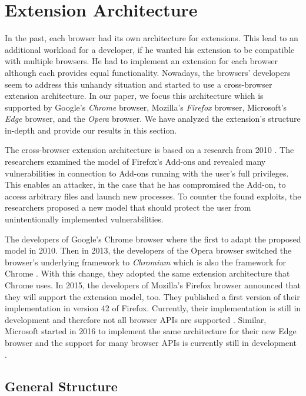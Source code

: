 \newpage
\section{Extension Architecture}
\label{sec:extensionArchitecture}

	In the past, each browser had its own architecture for extensions. This lead to an additional workload for a developer, if he wanted his extension to be compatible with multiple browsers. He had to implement an extension for each browser although each provides equal functionality. Nowadays, the browsers' developers seem to address this unhandy situation and started to use a cross-browser extension architecture. In our paper, we focus this architecture which is supported by Google's \textit{Chrome} browser, Mozilla's \textit{Firefox} browser, Microsoft's \textit{Edge} browser, and the \textit{Opera} browser. We have analyzed the extension's structure in-depth and provide our results in this section.

	The cross-browser extension architecture is based on a research from 2010 \cite{Barth10protectingbrowsers}. The researchers examined the model of Firefox's Add-ons and revealed many vulnerabilities in connection to Add-ons running with the user's full privileges. This enables an attacker, in the case that he has compromised the Add-on, to access arbitrary files and launch new processes. To counter the found exploits, the researchers proposed a new model that should protect the user from unintentionally implemented vulnerabilities.

	The developers of Google's Chrome browser where the first to adapt the proposed model in 2010. Then in 2013, the developers of the Opera browser switched the browser's underlying framework to \textit{Chromium} which is also the framework for Chrome \cite{operaBlogSwitchToChromium}. With this change, they adopted the same extension architecture that Chrome uses. In 2015, the developers of Mozilla's Firefox browser announced that they will support the extension model, too. They published a first version of their implementation in version 42 of Firefox. Currently, their implementation is still in development and therefore not all browser APIs are supported \cite{mozillaWebExtensionStatus}. Similar, Microsoft started in 2016 to implement the same architecture for their new Edge browser and the support for many browser APIs is currently still in development \cite{edgeBrowserApiStatus}.

\subsection{General Structure}

